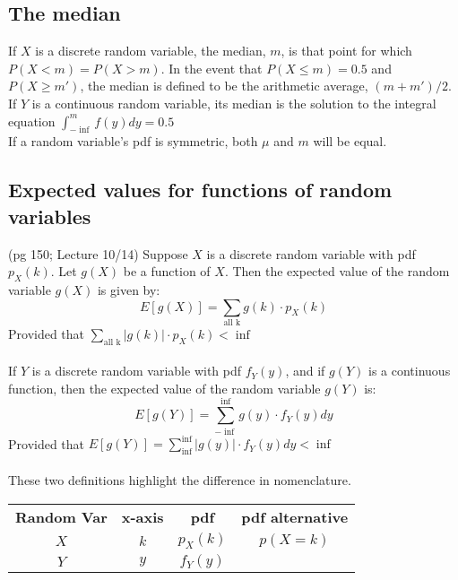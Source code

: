 \subsection{The median}
If $X$ is a discrete random variable, the median, $m$, is that point for which $P(X < m) = P(X>m)$.  In the event that $P(X \leq m) = 0.5$ and $P(X \geq m')$, the median is defined to be the arithmetic average, $(m + m')/2$.  \hfill \\
If $Y$ is a continuous random variable, its median is the solution to the integral equation $\int_{- \inf}^{m} f(y)dy = 0.5$  \hfill \\
If a random variable's pdf is symmetric, both $\mu$ and $m$ will be equal.  

\subsection{Expected values for functions of random variables}
{\tiny (pg 150; Lecture 10/14)}  Suppose $X$ is a discrete random variable with pdf $p_X(k)$.  Let $g(X)$ be a function of $X$.  Then the expected value of the random variable $g(X)$ is given by: \hfill \\
	\[ E[g(X)] = \sum\limits_{\mbox{all k}} g(k) \cdot p_X(k) \]
Provided that $\sum\limits_{\mbox{all k}} | g(k)| \cdot p_X(k) < \inf$
\hfill \\
\hfill \\
If $Y$ is a discrete random variable with pdf $f_Y(y)$, and if $g(Y)$ is a continuous function, then the expected value of the random variable $g(Y)$ is: \hfill \\
	\[ E[g(Y)] = \sum\limits_{- \inf}^{\inf} g(y) \cdot f_Y(y)dy \]
Provided that $E[g(Y)] = \sum\limits_{\inf}^{\inf} | g(y)| \cdot f_Y(y)dy < \inf$  \hfill \\
\hfill \\
These two definitions highlight the difference in nomenclature. 

\begin{center}
\begin{tabular}{ c c c c }
 \textbf{Random Var} & \textbf{x-axis} & \textbf{pdf}  & \textbf{pdf alternative} \\ 
 $X$ & $k$ & $p_X(k)$ & $p(X=k) $ \\  
 $Y$ & $y$ & $f_Y(y)$    
\end{tabular}
\end{center}
\hfill \\


